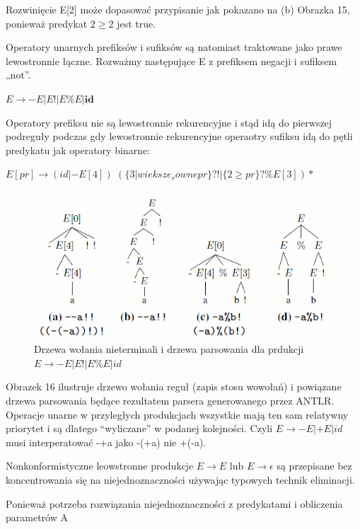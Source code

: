 Rozwinięcie E[2] może dopasować przypisanie jak pokazano na (b) Obrazka 15, ponieważ predykat
$2 \geq 2$ jest true.
\par
Operatory unarnych prefiksów i sufiksów są natomiast traktowane jako prawe lewostronnie łączne.
Rozważmy następujące E z prefiksem negacji i sufiksem „not”.
\par
$E \rightarrow -E |E !|E \%E | \textbf{id}$
\par
Operatory prefiksu nie są lewostronnie rekurencyjne i stąd idą do
pierwszej podreguły podczas gdy lewostronnie rekurencyjne operaotry sufiksu idą do pętli predykatu 
jak operatory binarne:
\par
$E[pr] \rightarrow (id | - E[4])$
$(\{3 |wieksze_rowne pr\}? !| \{2 \geq pr\}? \%E[3])*$
\begin{figure}[h]
\includegraphics[scale=0.67]{Figure16.png}
\caption{Drzewa wołania nieterminali i drzewa parsowania dla prdukcji
$E\rightarrow-E|E!|E\%E|id$}
\end{figure}
Obrazek 16 ilustruje drzewo wołania reguł (zapis stosu wowołań) i powiązane drzewa parsowania będące
rezultatem parsera generowanego przez ANTLR. Operacje unarne w przyległych produkcjach wszystkie mają
ten sam relatywny priorytet i są dlatego “wyliczane” w podanej kolejności.
Czyli
$E \rightarrow -E | + E | id$ musi interperatować -+a jako -(+a) nie +(-a).
\par
Nonkonformistyczne leowstronne produkcje $E \rightarrow E$ lub
$E \rightarrow \epsilon $ są przepisane bez koncentrowania się na niejednoznaczności używając typowych
technik eliminacji.
\par
Ponieważ potrzeba rozwiązania niejednoznaczności z predykatami i obliczenia parametrów A
